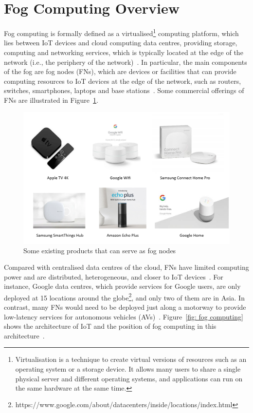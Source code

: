 \documentclass[11pt]{phdthesis}
\begin{document}
\section{Fog Computing Overview} \label{fog paradigm}
Fog computing is formally defined as a virtualised\footnote{Virtualisation is a technique to create virtual versions of resources such as an operating system or a storage device. It allows many users to share a single physical server and different operating systems, and applications can run on the same hardware at the same time.} computing platform, which lies between IoT devices and cloud computing data centres, providing storage, computing and networking services, which is typically located at the edge of the network (i.e., the periphery of the network)~\citep{bonomi2012fog}. In particular, the main components of the fog are fog nodes (FNs), which are devices or facilities that can provide computing resources to IoT devices at the edge of the network, such as routers, switches, smartphones, laptops and base stations~\citep{yi2015survey}. Some commercial offerings of FNs are illustrated in Figure~\ref{fig: fog nodes}.
\begin{figure}
	\center
	\includegraphics[width=1.0\linewidth]{./Figures/fog_nodes.png}
	\caption[Caption for LOF]{Some existing products that can serve as fog nodes}
	\label{fig: fog nodes}
\end{figure}
Compared with centralised data centres of the cloud, FNs have limited computing power and are distributed, heterogeneous,  and closer to IoT devices~\citep{tordera2016fog}. For instance, Google data centres, which provide services for Google users, are only deployed at 15 locations around the globe\footnote{https://www.google.com/about/datacenters/inside/locations/index.html}, and only two of them are in Asia. In contrast, many FNs would need to be deployed just along a motorway to provide low-latency services for autonomous vehicles (AVs)~\citep{xiao2017vehicular}.  Figure~\ref{fig: fog computing} shows the architecture of IoT and the position of fog computing in this architecture~\citep{bonomi2012fog}. 
\end{document}
